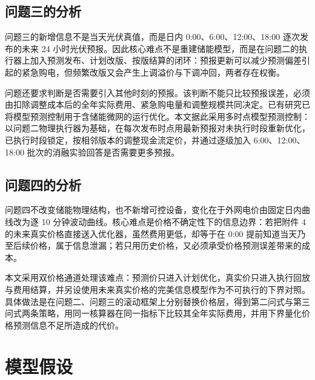 \documentclass[withoutpreface,bwprint]{cumcmthesis}
\begin{document}
\subsection{问题三的分析}

问题三的新增信息不是当天光伏真值，而是日内 0:00、6:00、12:00、18:00 逐次发布的未来 24 小时光伏预报。因此核心难点不是重建储能模型，而是在问题二的执行器上加入预测发布、计划改版、按版结算的闭环：预报更新可以减少预测偏差引起的紧急购电，但频繁改版又会产生上调溢价与下调冲回，两者存在权衡。

问题还要求判断是否需要引入其他时刻的预报。该判断不能只比较预报误差，必须由扣除调整成本后的全年实际费用、紧急购电量和调整规模共同决定。已有研究已将模型预测控制用于含储能微网的运行优化\cite{parisio2014mpc}。本文据此采用多时点模型预测控制：以问题二物理执行器为基础，在每次发布时点用最新预报对未执行时段重新优化，已执行时段锁定，按相邻版本的调整现金流定价，并通过逐级加入 6:00、12:00、18:00 批次的消融实验回答是否需要更多预报。

\subsection{问题四的分析}

问题四不改变储能物理结构，也不新增可控设备，变化在于外网电价由固定日内曲线改为逐 10 分钟波动曲线。核心难点是价格不确定性下的信息边界：若把附件 4 的未来真实价格直接送入优化器，虽然费用更低，却等于在 0:00 提前知道当天乃至后续价格，属于信息泄漏；若只用历史价格，又必须承受价格预测误差带来的成本。

本文采用双价格通道处理该难点：预测价只进入计划优化，真实价只进入执行回放与费用结算，并另设使用未来真实价格的完美信息模型作为不可执行的下界对照。具体做法是在问题二、问题三的滚动框架上分别替换价格层，得到第二问式与第三问式两条策略，用同一核算器在同一指标下比较其全年实际费用，并用下界量化价格预测信息不足所造成的代价。
























\section{模型假设}
\end{document}
